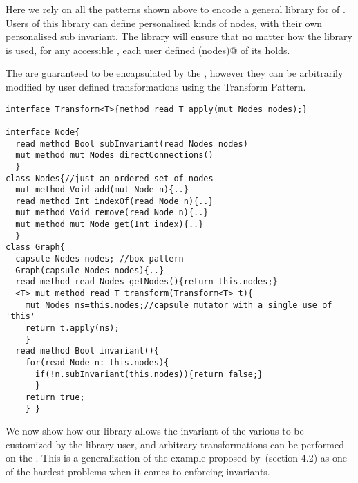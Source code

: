 

Here we rely on all the patterns shown above to encode a general library for \Q@Graph@s
of \Q@Node@s.
Users of this library can define personalised kinds of nodes,
with their own personalised sub invariant.
The library will ensure that no matter how the library is used, for any accessible \Q@Graph@, each user defined \Q@subInvariant(nodes)@ of its \Q@Node@s holds.

The \Q@Node@s are guaranteed to be encapsulated by the \Q@Graph@, however they can be arbitrarily modified by user defined transformations using the Transform Pattern.
\begin{lstlisting}
interface Transform<T>{method read T apply(mut Nodes nodes);}

interface Node{
  read method Bool subInvariant(read Nodes nodes)
  mut method mut Nodes directConnections()
  }
class Nodes{//just an ordered set of nodes 
  mut method Void add(mut Node n){..}
  read method Int indexOf(read Node n){..}
  mut method Void remove(read Node n){..}
  mut method mut Node get(Int index){..}
  }
class Graph{ 
  capsule Nodes nodes; //box pattern
  Graph(capsule Nodes nodes){..}
  read method read Nodes getNodes(){return this.nodes;}
  <T> mut method read T transform(Transform<T> t){
    mut Nodes ns=this.nodes;//capsule mutator with a single use of 'this'
    return t.apply(ns);
    }
  read method Bool invariant(){
    for(read Node n: this.nodes){
      if(!n.subInvariant(this.nodes)){return false;}
      }
    return true;
    } }
\end{lstlisting}
We now show how our \Q@Graph@ library allows the invariant of the various \Q@Node@s to be customized by the library user, and arbitrary transformations can be performed on the \Q@Graph@s. This is a generalization of the example proposed by~\cite{Summers:2009:NFO:1562154.1562160}(section 4.2) as one of the hardest problems when it comes to enforcing invariants.

